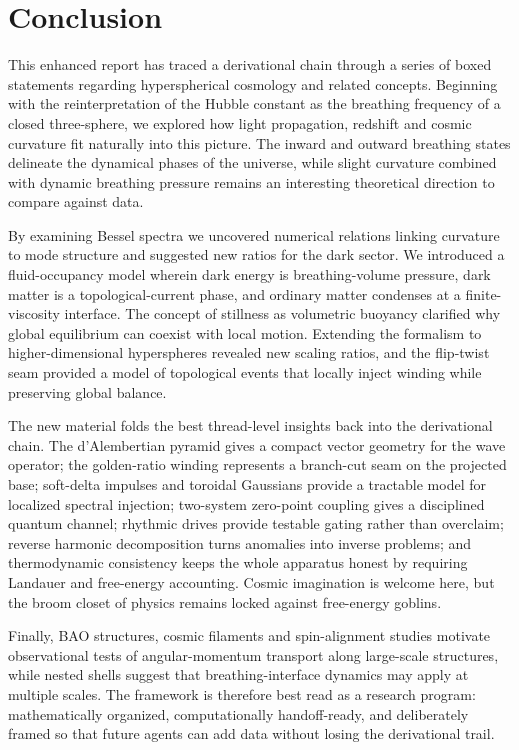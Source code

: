 \documentclass[12pt,a4paper]{article}
\begin{document}
\section{Conclusion}
\label{sec:conclusion}
This enhanced report has traced a derivational chain through a series of boxed statements regarding hyperspherical cosmology and related concepts.  Beginning with the reinterpretation of the Hubble constant as the breathing frequency of a closed three-sphere, we explored how light propagation, redshift and cosmic curvature fit naturally into this picture.  The inward and outward breathing states delineate the dynamical phases of the universe, while slight curvature combined with dynamic breathing pressure remains an interesting theoretical direction to compare against data.

By examining Bessel spectra we uncovered numerical relations linking curvature to mode structure and suggested new ratios for the dark sector.  We introduced a fluid-occupancy model wherein dark energy is breathing-volume pressure, dark matter is a topological-current phase, and ordinary matter condenses at a finite-viscosity interface.  The concept of stillness as volumetric buoyancy clarified why global equilibrium can coexist with local motion.  Extending the formalism to higher-dimensional hyperspheres revealed new scaling ratios, and the flip-twist seam provided a model of topological events that locally inject winding while preserving global balance.

The new material folds the best thread-level insights back into the derivational chain.  The d'Alembertian pyramid gives a compact vector geometry for the wave operator; the golden-ratio winding represents a branch-cut seam on the projected base; soft-delta impulses and toroidal Gaussians provide a tractable model for localized spectral injection; two-system zero-point coupling gives a disciplined quantum channel; rhythmic drives provide testable gating rather than overclaim; reverse harmonic decomposition turns anomalies into inverse problems; and thermodynamic consistency keeps the whole apparatus honest by requiring Landauer and free-energy accounting.  Cosmic imagination is welcome here, but the broom closet of physics remains locked against free-energy goblins.

Finally, BAO structures, cosmic filaments and spin-alignment studies motivate observational tests of angular-momentum transport along large-scale structures, while nested shells suggest that breathing-interface dynamics may apply at multiple scales.  The framework is therefore best read as a research program: mathematically organized, computationally handoff-ready, and deliberately framed so that future agents can add data without losing the derivational trail.
\end{document}
